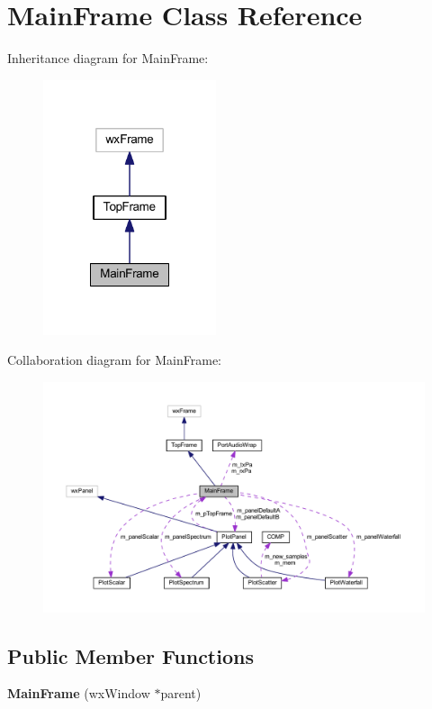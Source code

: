 \hypertarget{class_main_frame}{\section{Main\-Frame Class Reference}
\label{class_main_frame}
}


Inheritance diagram for Main\-Frame\-:
\nopagebreak
\begin{figure}[H]
\begin{center}
\leavevmode
\includegraphics[width=144pt]{class_main_frame__inherit__graph}
\end{center}
\end{figure}


Collaboration diagram for Main\-Frame\-:
\nopagebreak
\begin{figure}[H]
\begin{center}
\leavevmode
\includegraphics[width=350pt]{class_main_frame__coll__graph}
\end{center}
\end{figure}
\subsection*{Public Member Functions}
\begin{DoxyCompactItemize}
\item 
\hypertarget{class_main_frame_a394b51dbf31b7430ecad3f6ee1007e22}{{\bfseries Main\-Frame} (wx\-Window $\ast$parent)}\label{class_main_frame_a394b51dbf31b7430ecad3f6ee1007e22}

\end{DoxyCompactItemize}
